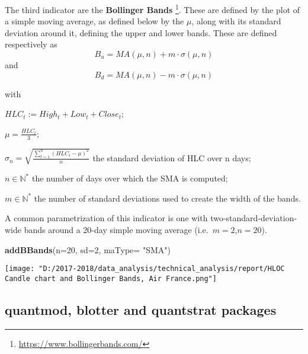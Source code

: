 \documentclass[
  11pt,
]{article}
\newenvironment{Shaded}{\begin{snugshade}}{\end{snugshade}}
\newcommand{\DataTypeTok}[1]{\textcolor[rgb]{0.13,0.29,0.53}{#1}}
\newcommand{\DecValTok}[1]{\textcolor[rgb]{0.00,0.00,0.81}{#1}}
\newcommand{\KeywordTok}[1]{\textcolor[rgb]{0.13,0.29,0.53}{\textbf{#1}}}
\newcommand{\NormalTok}[1]{#1}
\newcommand{\StringTok}[1]{\textcolor[rgb]{0.31,0.60,0.02}{#1}}
\let\origfigure\figure
\let\endorigfigure\endfigure
\renewenvironment{figure}[1][2] {
    \expandafter\origfigure\expandafter[H]
} {
    \endorigfigure
}
\begin{document}
The third indicator are the \textbf{Bollinger Bands} \footnote{\url{https://www.bollingerbands.com/}}.
These are defined by the plot of a simple moving average, as defined
below by the \(\mu\), along with its standard deviation around it,
defining the upper and lower bands. These are defined respectively as
\begin{equation}
B_u = MA(\mu, n) + m \cdot \sigma(\mu,n)
\end{equation} and \begin{equation}
B_d = MA(\mu, n) - m \cdot \sigma(\mu,n)
\end{equation}

with

\(HLC_t:=High_t +Low_t + Close_t\);

\(\mu= \frac{HLC_t}{3}\);

\(\sigma_n= \sqrt{\displaystyle \frac{\sum_{t=1}^{n} {(HLC_t-\mu)^2}}{n}}\)
the standard deviation of HLC over n days;

\(n \in \mathbb{N^*}\) the number of days over which the SMA is
computed;

\(m \in \mathbb{N^*}\) the number of standard deviations used to create
the width of the bands.

A common parametrization of this indicator is one with
two-standard-deviation-wide bands around a 20-day simple moving average
(i.e.~\(m=2\),\(n=20\)).

\begin{Shaded}
\begin{Highlighting}[]
\KeywordTok{addBBands}\NormalTok{(}\DataTypeTok{n=}\DecValTok{20}\NormalTok{, }\DataTypeTok{sd=}\DecValTok{2}\NormalTok{, }\DataTypeTok{maType=} \StringTok{"SMA"}\NormalTok{) }
\end{Highlighting}
\end{Shaded}

\begin{figure}
\centering
\texttt{[image: "D:/2017-2018/data\_analysis/technical\_analysis/report/HLOC Candle chart and Bollinger Bands, Air France.png"]}
\caption{Daily HLOC Chart price with Bollinger Bands (20,2)}
\end{figure}

\hypertarget{quantmod-blotter-and-quantstrat-packages}{%
\subsection{quantmod, blotter and quantstrat
packages}\label{quantmod-blotter-and-quantstrat-packages}}
\end{document}
